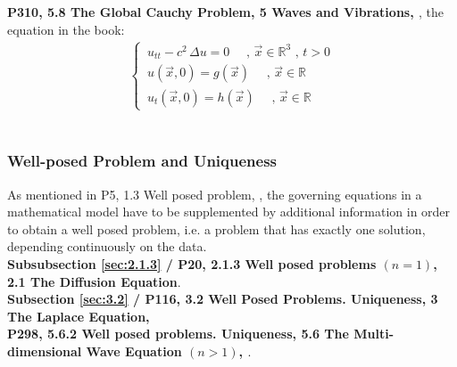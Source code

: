 \documentclass[../main.tex]{subfiles}
\begin{document}
\textbf{P310, 5.8 The Global Cauchy Problem, 5 Waves and Vibrations, \cite{salsa2016partial}}, the equation in the book:
\begin{align}
    \begin{cases} \nonumber
        \, u_{tt} - c^2 \, \Delta u = 0 \quad \text{ ,  } \vec{x} \in \mathbb{R}^3 \text{ ,  } t > 0\\
        \, u(\vec{x}, 0) = g(\vec{x}) \quad \text{ ,  } \vec{x} \in \mathbb{R} \\
        \, u_t(\vec{x}, 0) = h(\vec{x})\quad \text{ ,  } \vec{x} \in \mathbb{R}
    \end{cases}
\end{align} \\

\subsubsection{Well-posed Problem and Uniqueness}

As mentioned in P5, 1.3 Well posed problem, \cite{salsa2016partial}, the governing equations in a mathematical model have to be supplemented by additional information in order to obtain a well posed problem, i.e. a problem that has exactly one solution, depending continuously on the data. \\

\textbf{Subsubsection \ref{sec:2.1.3} / P20, 2.1.3 Well posed problems $(n = 1)$, 2.1 The Diffusion Equation}. \\

\textbf{Subsection \ref{sec:3.2} / P116, 3.2 Well Posed Problems. Uniqueness, 3 The Laplace Equation, \cite{salsa2016partial}} \\

\textbf{P298, 5.6.2 Well posed problems. Uniqueness, 5.6 The Multi-dimensional Wave Equation $(n > 1)$, \cite{salsa2016partial}}.
\end{document}
